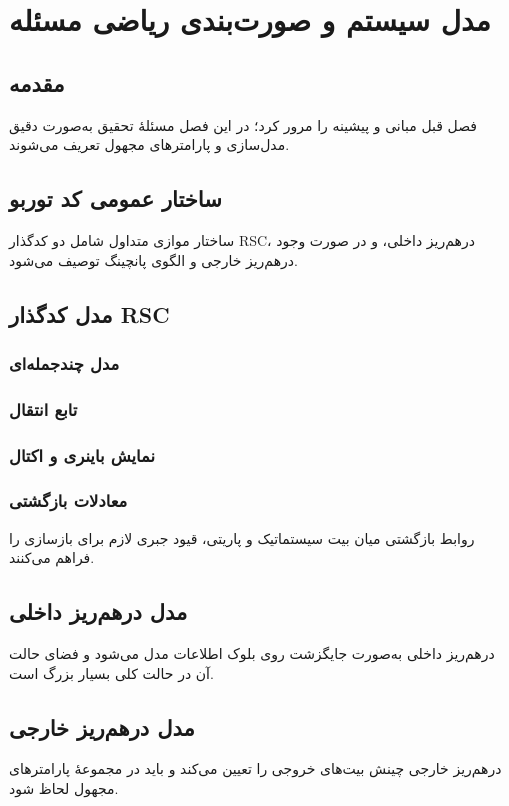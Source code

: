 \chapter{مدل سیستم و صورت‌بندی ریاضی مسئله}
\label{chap:system-model}

\section{مقدمه}
فصل قبل مبانی و پیشینه را مرور کرد؛ در این فصل مسئلهٔ تحقیق به‌صورت دقیق مدل‌سازی و پارامترهای مجهول تعریف می‌شوند.

\section{ساختار عمومی کد توربو}
ساختار موازی متداول شامل دو کدگذار RSC، درهم‌ریز داخلی، و در صورت وجود درهم‌ریز خارجی و الگوی پانچینگ توصیف می‌شود.

\section{مدل کدگذار RSC}
\subsection{مدل چندجمله‌ای}
\subsection{تابع انتقال}
\subsection{نمایش باینری و اکتال}
\subsection{معادلات بازگشتی}
روابط بازگشتی میان بیت سیستماتیک و پاریتی، قیود جبری لازم برای بازسازی را فراهم می‌کنند.

\section{مدل درهم‌ریز داخلی}
درهم‌ریز داخلی به‌صورت جایگزشت روی بلوک اطلاعات مدل می‌شود و فضای حالت آن در حالت کلی بسیار بزرگ است.

\section{مدل درهم‌ریز خارجی}
درهم‌ریز خارجی چینش بیت‌های خروجی را تعیین می‌کند و باید در مجموعهٔ پارامترهای مجهول لحاظ شود.


